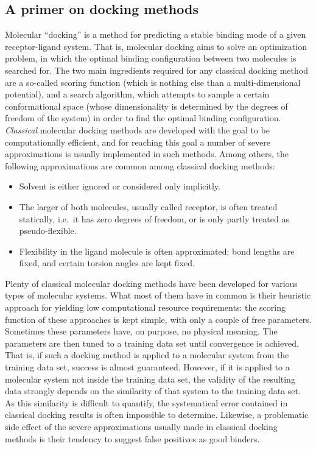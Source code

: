 \subsection{A primer on docking methods}

Molecular \enquote{docking} is a method for predicting a stable binding mode of
a given receptor-ligand system. That is, molecular docking aims to solve an
optimization problem, in which the optimal binding configuration between two
molecules is searched for. The two main ingredients required for any classical
docking method are a so-called scoring function (which is nothing else than a
multi-dimensional potential), and a search algorithm, which attempts to sample a
certain conformational space (whose dimensionality is determined by the degrees
of freedom of the system) in order to find the optimal binding configuration.
\textit{Classical} molecular docking methods are developed with the goal to be
computationally efficient, and for reaching this goal a number of severe
approximations is usually implemented in such methods. Among others, the
following approximations are common among classical docking methods:

\begin{itemize}
\item Solvent is either ignored or considered only implicitly.
\item The larger of both molecules, usually called receptor, is often treated
statically, i.e.\ it has zero degrees of freedom, or is only partly treated as
pseudo-flexible.
\item Flexibility in the ligand molecule is often approximated: bond lengths are
fixed, and certain torsion angles are kept fixed.
\end{itemize}

Plenty of classical molecular docking methods have been developed for various
types of molecular systems. What most of them have in common is their heuristic
approach for yielding low computational resource requirements: the scoring
function of these approaches is kept simple, with only a couple of free
parameters. Sometimes these parameters have, on purpose, no physical meaning.
The parameters are then tuned to a training data set until convergence is
achieved. That is, if such a docking method is applied to a molecular system
from the training data set, success is almost guaranteed. However, if it is
applied to a molecular system not inside the training data set, the validity of
the resulting data strongly depends on the similarity of that system to the
training data set. As this similarity is difficult to quantify, the systematical
error contained in classical docking results is often impossible to determine.
Likewise, a problematic side effect of the severe approximations usually made in
classical docking methods is their tendency to suggest false positives as good
binders.


